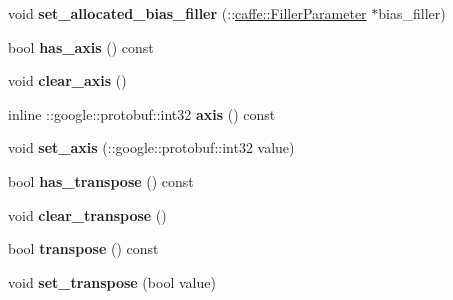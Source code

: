 \begin{DoxyCompactItemize}
void {\bfseries set\+\_\+allocated\+\_\+bias\+\_\+filler} (\+::\mbox{\hyperlink{classcaffe_1_1_filler_parameter}{caffe\+::\+Filler\+Parameter}} $\ast$bias\+\_\+filler)
\item 
\mbox{\label{classcaffe_1_1_inner_product_parameter_a085e2486fd4c26bac9c2da1adba95e50}} 
bool {\bfseries has\+\_\+axis} () const
\item 
\mbox{\label{classcaffe_1_1_inner_product_parameter_a4480734a963215e3fbe89029b4076176}} 
void {\bfseries clear\+\_\+axis} ()
\item 
\mbox{\label{classcaffe_1_1_inner_product_parameter_a2b49e373e2f383e17dc119dab081cb6c}} 
inline \+::google\+::protobuf\+::int32 {\bfseries axis} () const
\item 
\mbox{\label{classcaffe_1_1_inner_product_parameter_afbab482ca8a61e9683e4d3e877f9a739}} 
void {\bfseries set\+\_\+axis} (\+::google\+::protobuf\+::int32 value)
\item 
\mbox{\label{classcaffe_1_1_inner_product_parameter_a8be44c666de1aa32ab980a6c0e290fab}} 
bool {\bfseries has\+\_\+transpose} () const
\item 
\mbox{\label{classcaffe_1_1_inner_product_parameter_a3ae6ccd09df138f3c6e2785bb64f9585}} 
void {\bfseries clear\+\_\+transpose} ()
\item 
\mbox{\label{classcaffe_1_1_inner_product_parameter_a48939a318f5a272eb7c7e56553a39296}} 
bool {\bfseries transpose} () const
\item 
\mbox{\label{classcaffe_1_1_inner_product_parameter_ade6389304b6687afaef4fb03281aa587}} 
void {\bfseries set\+\_\+transpose} (bool value)
\end{DoxyCompactItemize}
